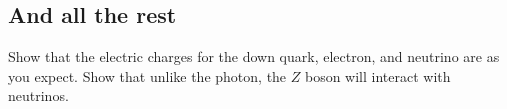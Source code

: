 \documentclass[12pt]{article}
\numberwithin{equation}{section}    %
\begin{document}
\subsection*{And all the rest}

Show that the electric charges for the down quark, electron, and neutrino are as you expect. Show that unlike the photon, the $Z$ boson will interact with neutrinos.




 
\end{document}
